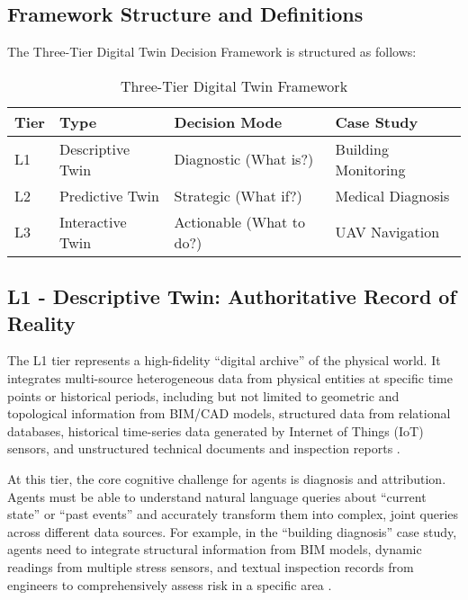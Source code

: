 \subsection{Framework Structure and Definitions}

The Three-Tier Digital Twin Decision Framework is structured as follows:

\begin{table}[h]
\centering
\caption{Three-Tier Digital Twin Framework}
\label{tab:three_tier_framework}
\begin{tabular}{llll}
\toprule
\textbf{Tier} & \textbf{Type} & \textbf{Decision Mode} & \textbf{Case Study} \\
\midrule
L1 & Descriptive Twin & Diagnostic (What is?) & Building Monitoring \\
L2 & Predictive Twin & Strategic (What if?) & Medical Diagnosis \\
L3 & Interactive Twin & Actionable (What to do?) & UAV Navigation \\
\bottomrule
\end{tabular}
\end{table}

\subsection{L1 - Descriptive Twin: Authoritative Record of Reality}

The L1 tier represents a high-fidelity ``digital archive'' of the physical world. It integrates multi-source heterogeneous data from physical entities at specific time points or historical periods, including but not limited to geometric and topological information from BIM/CAD models, structured data from relational databases, historical time-series data generated by Internet of Things (IoT) sensors, and unstructured technical documents and inspection reports \cite{tao2018digital, negri2017review}.

At this tier, the core cognitive challenge for agents is diagnosis and attribution. Agents must be able to understand natural language queries about ``current state'' or ``past events'' and accurately transform them into complex, joint queries across different data sources. For example, in the ``building diagnosis'' case study, agents need to integrate structural information from BIM models, dynamic readings from multiple stress sensors, and textual inspection records from engineers to comprehensively assess risk in a specific area \cite{boje2020towards}.

